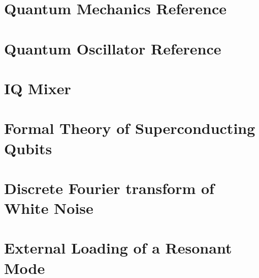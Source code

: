 \begin{appendices}

\chapter{Quantum Mechanics Reference} \label{appendix:quantumMechanics}

\chapter{Quantum Oscillator Reference} \label{appendix:quantumOscillator}

\chapter{IQ Mixer} \label{appendix:IQMixer}

\chapter{Formal Theory of Superconducting Qubits} \label{appendix:qubitTheory}

\chapter{Discrete Fourier transform of White Noise} \label{appendix:whiteNoiseDFT}

\chapter{External Loading of a Resonant Mode} \label{appendix:loadedMode}

\end{appendices}
